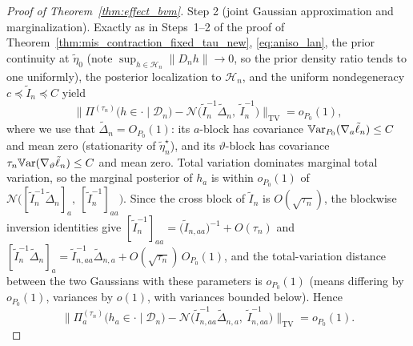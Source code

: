 \documentclass[11pt]{article}
\theoremstyle{definition}
\theoremstyle{plain}
\newcommand{\Var}{\mathbb{V}{\rm ar}}
\begin{document}
\begin{proof}[Proof of Theorem~\ref{thm:effect_bvm}]
Step 2 (joint Gaussian approximation and marginalization). Exactly as in Steps~1--2 of the proof of Theorem~\ref{thm:mis_contraction_fixed_tau_new}, \eqref{eq:aniso_lan}, the prior continuity at $\tilde\eta_0$ (note $\sup_{h\in\mathcal H_n}\|D_nh\|\to0$, so the prior density ratio tends to one uniformly), the posterior localization to $\mathcal H_n$, and the uniform nondegeneracy $c\preceq\tilde I_n\preceq C$ yield
\begin{equation}
\big\|\Pi^{(\tau_n)}\big(h\in\cdot\mid\mathcal D_n\big)-\mathcal N\big(\tilde I_n^{-1}\tilde\Delta_n,\ \tilde I_n^{-1}\big)\big\|_{\mathrm{TV}}=o_{P_0}(1),
\label{eq:joint_tv_gaussian}
\end{equation}
where we use that $\tilde\Delta_n=O_{P_0}(1)$: its $a$-block has covariance $\Var_{P_0}(\nabla_a\tilde\ell_n)\le C$ and mean zero (stationarity of $\tilde\eta_n^\star$), and its $\vartheta$-block has covariance $\tau_n\Var(\nabla_\vartheta\tilde\ell_n)\le C$ and mean zero. Total variation dominates marginal total variation, so the marginal posterior of $h_a$ is within $o_{P_0}(1)$ of $\mathcal N\big([\tilde I_n^{-1}\tilde\Delta_n]_a,\ [\tilde I_n^{-1}]_{aa}\big)$. Since the cross block of $\tilde I_n$ is $O(\sqrt{\tau_n})$, the blockwise inversion identities give
$[\tilde I_n^{-1}]_{aa}=\big(\tilde I_{n,aa}\big)^{-1}+O(\tau_n)$ and
$[\tilde I_n^{-1}\tilde\Delta_n]_a=\tilde I_{n,aa}^{-1}\tilde\Delta_{n,a}+O(\sqrt{\tau_n})\,O_{P_0}(1)$,
and the total-variation distance between the two Gaussians with these parameters is $o_{P_0}(1)$ (means differing by $o_{P_0}(1)$, variances by $o(1)$, with variances bounded below). Hence
\begin{equation}
\big\|\Pi_a^{(\tau_n)}\big(h_a\in\cdot\mid\mathcal D_n\big)-\mathcal N\big(\tilde I_{n,aa}^{-1}\tilde\Delta_{n,a},\ \tilde I_{n,aa}^{-1}\big)\big\|_{\mathrm{TV}}=o_{P_0}(1).
\label{eq:marginal_bvm_pseudotrue}
\end{equation}


\end{proof}
\end{document}
